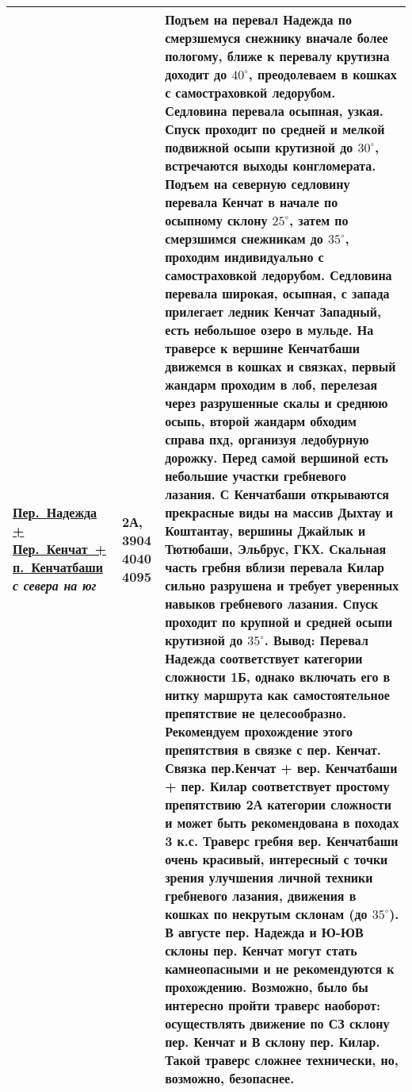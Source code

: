 {\begin{longtable}{|>{\centering\arraybackslash}m{3.8cm}|>{\centering\arraybackslash}m{1.3cm}|>{\raggedright\arraybackslash}m{12.5cm}|}
			\hyperref[subsec:Day16]{Пер.~Надежда + Пер.~Кенчат~+ п.~Кенчатбаши}										\newline\textit{с севера на юг}			&	2А, 3904 4040 4095			&	Подъем на перевал Надежда по смерзшемуся снежнику вначале более пологому, ближе к перевалу крутизна доходит до $40^\circ$, преодолеваем в кошках с самостраховкой ледорубом. Седловина перевала осыпная, узкая. Спуск проходит по средней и мелкой подвижной осыпи крутизной до $30^\circ$, встречаются выходы конгломерата. Подъем на северную седловину перевала Кенчат в начале по осыпному склону $25^\circ$, затем по смерзшимся снежникам до $35^\circ$, проходим индивидуально с самостраховкой ледорубом. Седловина перевала широкая, осыпная, с запада прилегает ледник Кенчат Западный, есть небольшое озеро в мульде. На траверсе к вершине Кенчатбаши движемся в кошках и связках, первый жандарм проходим в лоб, перелезая через разрушенные скалы и среднюю осыпь, второй жандарм обходим справа пхд, организуя ледобурную дорожку. Перед самой вершиной есть небольшие участки гребневого лазания. С Кенчатбаши открываются прекрасные виды на массив Дыхтау и Коштантау, вершины Джайлык и Тютюбаши, Эльбрус, ГКХ. Скальная часть гребня вблизи перевала Килар сильно разрушена и требует уверенных навыков гребневого лазания. Спуск проходит по крупной и средней осыпи крутизной до $35^\circ$. \newline \textbf{Вывод:} Перевал Надежда соответствует категории сложности 1Б, однако включать его в нитку маршрута как самостоятельное препятствие не целесообразно. Рекомендуем прохождение этого препятствия в связке с пер. Кенчат. Связка пер.Кенчат + вер. Кенчатбаши + пер. Килар соответствует простому препятствию 2А категории сложности и может быть рекомендована в походах 3 к.с. Траверс гребня вер. Кенчатбаши очень красивый, интересный с точки зрения улучшения личной техники гребневого лазания, движения в кошках по некрутым склонам (до $35^\circ$). В августе пер. Надежда и Ю-ЮВ склоны пер. Кенчат могут стать камнеопасными и не рекомендуются к прохождению. Возможно, было бы интересно пройти траверс наоборот: осуществлять движение по СЗ склону пер. Кенчат и В склону пер. Килар. Такой траверс сложнее технически, но, возможно, безопаснее.	\\ \hline

\end{longtable}}
